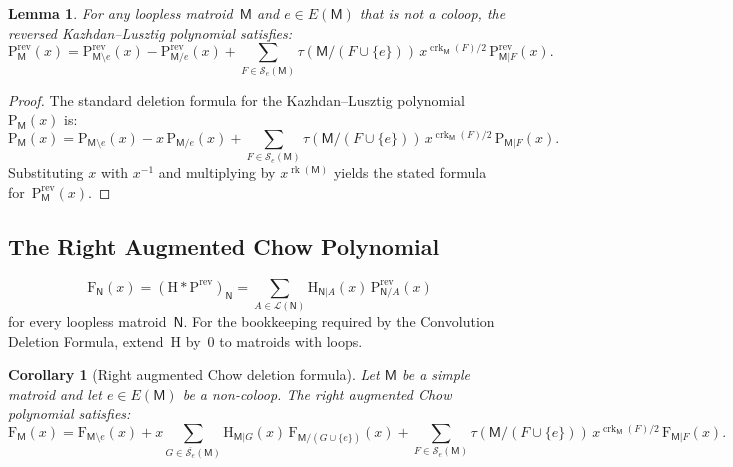 \documentclass[12pt,letterpaper,english]{amsart}
\theoremstyle{teoremas}
\newtheorem{corollary}[theorem]{Corollary}
\newtheorem{lemma}[theorem]{Lemma}
\theoremstyle{definition}
\DeclareMathOperator{\rk}{rk}
\DeclareMathOperator{\crk}{crk}
\newcommand{\M}{\mathsf{M}}
\newcommand{\N}{\mathsf{N}}
\renewcommand{\H}{\mathrm{H}}
\newcommand{\PP}{\mathrm{P}}
\newcommand{\FF}{\mathrm{F}}
\newcommand{\rev}{\mathrm{rev}}
\newcommand{\Se}{\mathcal{S}_e}
\begin{document}
\begin{lemma}\label{lem:Prev-del}
For any loopless matroid~$\M$ and $e \in E(\M)$ that is not a coloop,
the reversed Kazhdan--Lusztig polynomial satisfies:
\[
\PP^{\rev}_{\M}(x) = \PP^{\rev}_{\M \setminus e}(x)
  - \PP^{\rev}_{\M/e}(x)
  + \sum_{F \in \Se(\M)}
    \tau(\M/(F \cup \{e\}))\, x^{\crk_{\M}(F)/2}\,
    \PP^{\rev}_{\M|F}(x).
\]
\end{lemma}

\begin{proof}
The standard deletion formula for the Kazhdan--Lusztig polynomial
$\PP_{\M}(x)$ is:
\[
\PP_{\M}(x) = \PP_{\M \setminus e}(x) - x\, \PP_{\M/e}(x)
  + \sum_{F \in \Se(\M)}
    \tau(\M/(F \cup \{e\}))\, x^{\crk_{\M}(F)/2}\,
    \PP_{\M|F}(x).
\]
Substituting $x$ with $x^{-1}$ and multiplying by $x^{\rk(\M)}$
yields the stated formula for~$\PP^{\rev}_{\M}(x)$.
\end{proof}


\subsection{The Right Augmented Chow Polynomial}

\[
\FF_{\N}(x) = (\H * \PP^{\rev})_{\N}
= \sum_{A \in \mathcal{L}(\N)}
  \H_{\N|A}(x)\, \PP^{\rev}_{\N/A}(x)
\]
for every loopless matroid~$\N$.
For the bookkeeping required by the Convolution Deletion Formula,
extend~$\H$ by~$0$ to matroids with loops.

\begin{corollary}[Right augmented Chow deletion formula]\label{cor:aug-chow-del}
Let $\M$ be a simple matroid and let $e \in E(\M)$ be a non-coloop.
The right augmented Chow polynomial satisfies:
\begin{equation}\label{eq:aug-chow-del}
\FF_{\M}(x) = \FF_{\M \setminus e}(x)
  + x \sum_{G \in \overline{\Se}(\M)}
    \H_{\M|G}(x)\, \FF_{\M/(G \cup \{e\})}(x)
  + \sum_{F \in \Se(\M)}
    \tau(\M/(F \cup \{e\}))\, x^{\crk_{\M}(F)/2}\,
    \FF_{\M|F}(x).
\end{equation}
\end{corollary}
\end{document}
